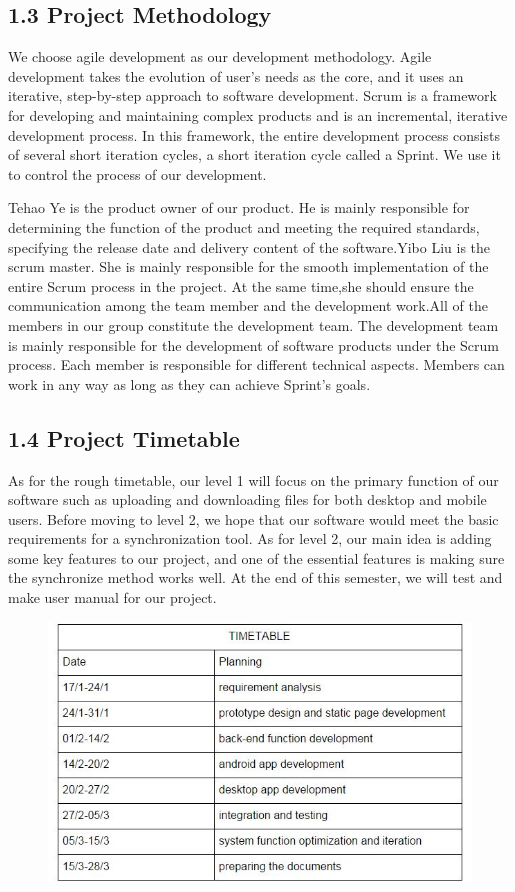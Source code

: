 \documentclass[a4paper]{report}
\begin{document}
\subsection* {1.3 Project Methodology}
We choose agile development as our development methodology. Agile development takes the evolution of user's needs as the core, and it uses an iterative, step-by-step approach to software development. Scrum is a framework for developing and maintaining complex products and is an incremental, iterative development process. In this framework, the entire development process consists of several short iteration cycles, a short iteration cycle called a Sprint. We use it to control the process of our development.


Tehao Ye is the product owner of our product. He is mainly responsible for determining the function of the product and meeting the required standards, specifying the release date and delivery content of the software.Yibo Liu is the scrum master. She is mainly responsible for the smooth implementation of the entire Scrum process in the project. At the same time,she should ensure the communication among the team member and the development work.All of the members in our group constitute the development team. The development team is mainly responsible for the development of software products under the Scrum process. Each member is responsible for different technical aspects. Members can work in any way as long as they can achieve Sprint's goals.


\subsection* {1.4  Project Timetable }

As for the rough timetable, our level 1 will focus on the primary function of our software such as uploading and downloading files for both desktop and mobile users.  Before moving to level 2, we hope that our software would meet the basic requirements for a synchronization tool. As for level 2, our main idea is adding some key features to our project, and one of the essential features is making sure the synchronize method works well. At the end of this semester, we will test and make user manual for our project.




\begin{figure}[h]
\centering
\includegraphics[width=4.6in]{1}
\end{figure}
\end{document}
